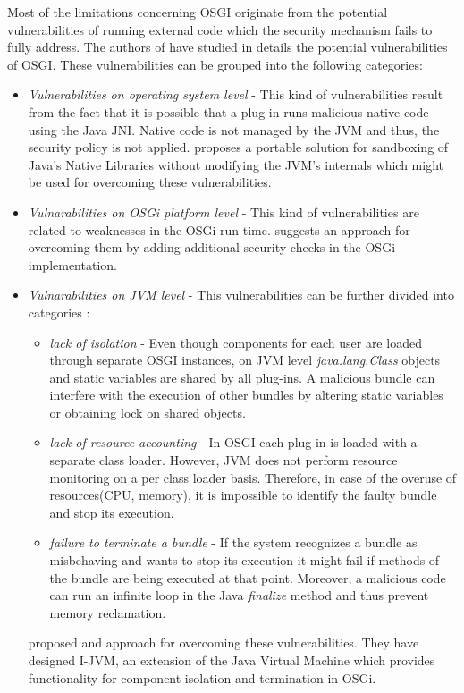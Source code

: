 Most of the limitations concerning OSGI originate from the potential vulnerabilities of running external code which the security mechanism fails to fully address. The authors of \cite{parrend2009security} have studied in details the potential vulnerabilities of OSGI. These vulnerabilities can be grouped into the following categories:

\begin{itemize}

	\item \textit{Vulnerabilities on operating system level} - This kind of vulnerabilities result from the fact that it is possible that a plug-in runs malicious native code using the Java JNI. Native code is not managed by the JVM and thus, the security policy is not applied. \cite{sun2012jvm} proposes a portable solution for sandboxing of Java's Native Libraries without modifying the JVM's internals which might be used for overcoming these vulnerabilities.
	
	\item \textit{Vulnarabilities on OSGi platform level} - This kind of vulnerabilities are related to weaknesses in the OSGi run-time. \cite{parrend2009security} suggests an approach for overcoming them by adding additional security checks in the OSGi implementation.
	
	\item \textit{Vulnarabilities on JVM level} - This vulnerabilities can be further divided into categories \cite{geoffray2009jvm}: 
	
	\begin{itemize}
		\item \textit{lack of isolation} - Even though components for each user are loaded through separate OSGI instances, on JVM level \textit{java.lang.Class} objects and static variables are shared by all plug-ins. A malicious bundle can interfere with the execution of other bundles by altering static variables or obtaining lock on shared objects.
		
		\item \textit{lack of resource accounting} - In OSGI each plug-in is loaded with a separate class loader. However, JVM does not perform resource monitoring on a per class loader basis. Therefore, in case of the overuse of resources(CPU, memory), it is impossible to identify the faulty bundle and stop its execution.
		
		\item \textit{failure to terminate a bundle} -  If the system recognizes a bundle as misbehaving and wants to stop its
execution it might fail if methods of the bundle are being executed at that point. Moreover, a malicious code can run an infinite loop in the Java \textit{finalize} method and thus prevent memory reclamation.
		
	\end{itemize}
	
	\cite{geoffray2009jvm} proposed and approach for overcoming these vulnerabilities. They have designed I-JVM, an extension of the Java Virtual Machine which provides functionality for component isolation and termination in OSGi.
	
\end{itemize}

